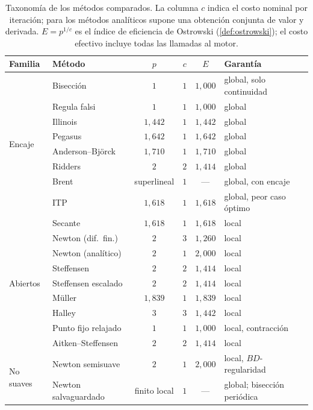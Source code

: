 \begin{table}[H]
\centering
\caption[Taxonomía de los métodos]{Taxonomía de los métodos comparados. La columna
$c$ indica el costo nominal por iteración; para los métodos analíticos supone
una obtención conjunta de valor y derivada. $E=p^{1/c}$ es el índice de
eficiencia de Ostrowski (\cref{def:ostrowski}); el costo efectivo incluye todas
las llamadas al motor.}
\label{tab:taxonomia}
\small
\begin{tabular}{@{}llccc l@{}}
\toprule
\textbf{Familia} & \textbf{Método} & \textbf{$p$} & \textbf{$c$} & \textbf{$E$} & \textbf{Garantía} \\
\midrule
\multirow{8}{*}{Encaje}
 & Bisección          & $1$      & $1$ & $1{,}000$ & global, solo continuidad \\
 & Regula falsi       & $1$      & $1$ & $1{,}000$ & global \\
 & Illinois           & $1{,}442$& $1$ & $1{,}442$ & global \\
 & Pegasus            & $1{,}642$& $1$ & $1{,}642$ & global \\
 & Anderson--Björck   & $1{,}710$& $1$ & $1{,}710$ & global \\
 & Ridders            & $2$      & $2$ & $1{,}414$ & global \\
 & Brent              & superlineal& $1$ & --- & global, con encaje \\
 & ITP                & $1{,}618$& $1$ & $1{,}618$ & global, peor caso óptimo \\
\midrule
\multirow{9}{*}{Abiertos}
 & Secante            & $1{,}618$& $1$ & $1{,}618$ & local \\
 & Newton (dif.\ fin.)& $2$      & $3$ & $1{,}260$ & local \\
 & Newton (analítico) & $2$      & $1$ & $2{,}000$ & local \\
 & Steffensen         & $2$      & $2$ & $1{,}414$ & local \\
 & Steffensen escalado& $2$      & $2$ & $1{,}414$ & local \\
 & Müller             & $1{,}839$& $1$ & $1{,}839$ & local \\
 & Halley             & $3$      & $3$ & $1{,}442$ & local \\
 & Punto fijo relajado& $1$      & $1$ & $1{,}000$ & local, contracción \\
 & Aitken--Steffensen & $2$      & $2$ & $1{,}414$ & local \\
\midrule
\multirow{2}{*}{No suaves}
 & Newton semisuave   & $2$      & $1$ & $2{,}000$ & local, $BD$-regularidad \\
 & Newton salvaguardado& finito local& $1$ & --- & global; bisección periódica \\
\bottomrule
\end{tabular}
\end{table}


